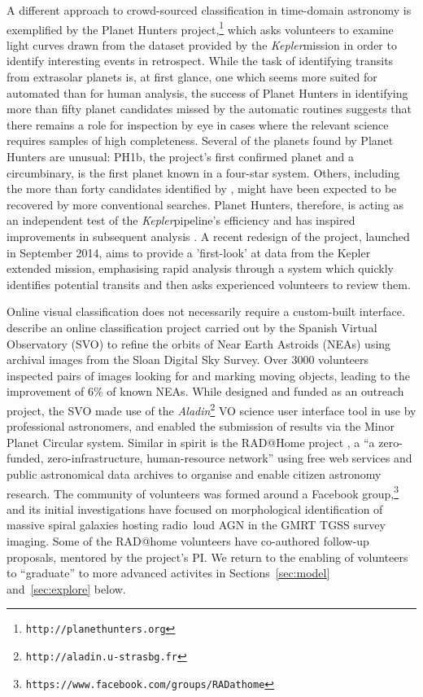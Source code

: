 \documentclass{ar2e}
\def\CaseStudy#1{\noindent{\it\bf #1 \,\,\,\,}}
\def\url#1{\texttt{#1}}
\def\Kepler{{\it Kepler}}
\begin{document}
A different approach to crowd-sourced classification in time-domain astronomy is
exemplified by the Planet Hunters
project,\footnote{\url{http://planethunters.org}} 
which asks volunteers to examine
light curves drawn from the dataset provided by the \Kepler mission in
order to identify interesting events in retrospect. While the task of
identifying transits from extrasolar planets is, at first glance, one which
seems more suited for automated than for human analysis, the success of Planet
Hunters in identifying more than fifty planet candidates missed by the automatic
routines suggests that there remains a role for inspection by eye in cases where
the relevant science requires samples of high completeness. Several of the
planets found by Planet Hunters are unusual: PH1b, the project's first confirmed
planet \citep{Schwamb++2013} and a circumbinary, is the first planet known in a
four-star system. 
Others, including the more than forty candidates identified 
by \citep{Wang++2013,Schmitt2014}, might have been
expected to be recovered by more conventional searches. Planet Hunters,
therefore, is acting as an independent test of the \Kepler pipeline's efficiency
\citep{Schwamb++2012} and has inspired improvements in subsequent analysis
\citep{Batalha++2013}. A recent redesign of the project, launched in September 2014, aims to provide a 'first-look' 
at data from the Kepler extended mission, emphasising rapid analysis through a 
system which quickly identifies potential transits and then asks experienced volunteers
to review them.


\CaseStudy{Using existing tools: Near Earth Asteroid precovery and RAD@home.} 
Online visual classification does not necessarily require a custom-built
interface. \citet{Solano2014} describe an online classification project carried
out by the Spanish Virtual Observatory (SVO) to refine the orbits of Near Earth
Astroids (NEAs) using archival images from the Sloan Digital Sky Survey. Over
3000 volunteers inspected pairs of images looking for and marking moving
objects, leading to the improvement of 6\% of known NEAs. While designed and
funded as an outreach project, the SVO made use of the
\textit{Aladin}\footnote{\url{http://aladin.u-strasbg.fr}} VO science user
interface tool in use by professional astronomers, and enabled the submission of
results via the Minor Planet Circular system. Similar in spirit is the RAD@Home
project \citep{Hota2014}, a ``a zero-funded, zero-infrastructure, human-resource
network'' using free web services and public astronomical data archives to
organise and enable citizen astronomy research. The community of volunteers was
formed around a Facebook
group,\footnote{\url{https://www.facebook.com/groups/RADathome}} and its initial
investigations have focused on morphological identification of massive spiral
galaxies hosting  radio~loud AGN \citep{Hota2011} in the GMRT TGSS survey
imaging.  Some of the RAD@home volunteers have co-authored follow-up proposals,
mentored by the project's PI. We return to the enabling of volunteers to
``graduate'' to more advanced activites in Sections~\ref{sec:model}
and~\ref{sec:explore} below. 
\end{document}
